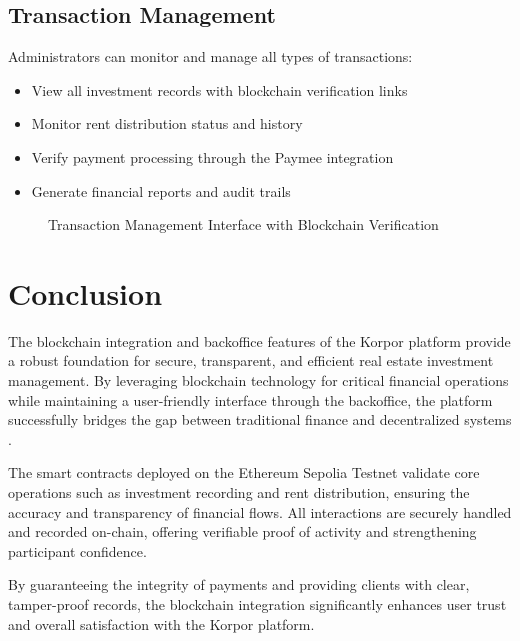 \subsection{Transaction Management}

Administrators can monitor and manage all types of transactions:

\begin{itemize}
    \item View all investment records with blockchain verification links
    \item Monitor rent distribution status and history
    \item Verify payment processing through the Paymee integration
    \item Generate financial reports and audit trails
\end{itemize}

\begin{figure}[htbp]
  \centering
  \caption{Transaction Management Interface with Blockchain Verification}
  \label{fig:transaction-management}
\end{figure}

\section*{Conclusion}

The blockchain integration and backoffice features of the Korpor platform provide a robust foundation for secure, transparent, and efficient real estate investment management. By leveraging blockchain technology for critical financial operations while maintaining a user-friendly interface through the backoffice, the platform successfully bridges the gap between traditional finance and decentralized systems \cite{Andoni2019BlockchainOverview}.

The smart contracts deployed on the Ethereum Sepolia Testnet validate core operations such as investment recording and rent distribution, ensuring the accuracy and transparency of financial flows. All interactions are securely handled and recorded on-chain, offering verifiable proof of activity and strengthening participant confidence.

By guaranteeing the integrity of payments and providing clients with clear, tamper-proof records, the blockchain integration significantly enhances user trust and overall satisfaction with the Korpor platform. 